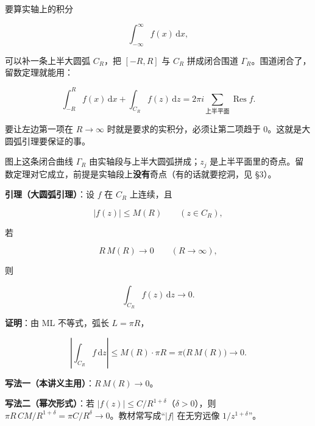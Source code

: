 \documentclass[11pt]{ctexart}
\let\origsubhdr\subhdr
\renewcommand{\subhdr}[1]{\par\needspace{4\baselineskip}\origsubhdr{#1}}
\begin{document}
要算实轴上的积分

$$
\int_{-\infty}^{\infty}f(x)\,\mathrm{d}x ,
$$

可以补一条上半大圆弧 $C_R$，把 $[-R,R]$ 与 $C_R$ 拼成闭合围道 $\Gamma_R$。围道闭合了，留数定理就能用：

$$
\int_{-R}^{R}f(x)\,\mathrm{d}x+\int_{C_R}f(z)\,\mathrm{d}z
=2\pi i\!\!\sum_{\text{上半平面}}\!\operatorname{Res}f .
$$

要让左边第一项在 $R\to\infty$ 时就是要求的实积分，必须让第二项趋于 0。这就是大圆弧引理要保证的事。

\begin{center}
\end{center}

图上这条闭合曲线 $\Gamma_R$ 由实轴段与上半大圆弧拼成；$z_j$ 是上半平面里的奇点。留数定理对它成立，前提是实轴段上\textbf{没有}奇点（有的话就要挖洞，见 §3）。


\textbf{引理（大圆弧引理）}：设 $f$ 在 $C_R$ 上连续，且

$$
|f(z)|\le M(R)\qquad(z\in C_R),
$$

若

$$
R\,M(R)\to0\qquad(R\to\infty),
$$

则

$$
\int_{C_R}f(z)\,\mathrm{d}z\to0 .
$$

\textbf{证明}：由 ML 不等式，弧长 $L=\pi R$，

$$
\left|\int_{C_R}f\,\mathrm{d}z\right|
\le M(R)\cdot \pi R
=\pi\bigl(R\,M(R)\bigr)\to0 .
$$



\textbf{写法一（本讲义主用）}：$R\,M(R)\to0$。

\textbf{写法二（幂次形式）}：若 $|f(z)|\le C/R^{1+\delta}$（$\delta>0$），则 $\pi R\,CM/R^{1+\delta}=\pi C/R^{\delta}\to0$。教材常写成“$|f|$ 在无穷远像 $1/z^{1+\delta}$”。
\end{document}
